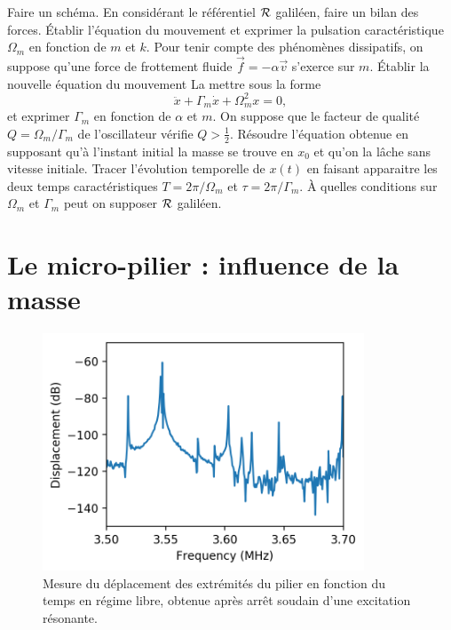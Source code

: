 \documentclass[12pt,a4paper]{exam}
\begin{document}
\begin{questions}
\question Faire un schéma.
\question En considérant le référentiel $\cal{R}$ galiléen, faire un bilan des forces.
\question Établir l'équation du mouvement et exprimer la pulsation caractéristique $\Omega_m$ en fonction de $m$ et $k$.
\question Pour tenir compte des phénomènes dissipatifs, on suppose qu'une force de frottement fluide $\overrightarrow{f}=-\alpha\overrightarrow{v}$ s'exerce sur $m$.
Établir la nouvelle équation du mouvement
\question La mettre sous la forme
\begin{equation}
\ddot{x} + \Gamma_m \dot{x} + \Omega_m^2 x = 0,
\label{eq:damped_oscillator}
\end{equation}
et exprimer $\Gamma_m$ en fonction de $\alpha$ et $m$.
\question On suppose que le facteur de qualité $Q=\Omega_m/\Gamma_m$ de l'oscillateur vérifie $Q>\frac{1}{2}$.
Résoudre l'équation obtenue en supposant qu'à l'instant initial la masse se trouve en $x_0$ et qu'on la lâche sans vitesse initiale.
\question Tracer l'évolution temporelle de $x(t)$ en faisant apparaitre les deux temps caractéristiques $T=2\pi/\Omega_m$ et $\tau=2\pi/\Gamma_m$.
\question À quelles conditions sur $\Omega_m$ et $\Gamma_m$ peut on supposer $\cal{R}$ galiléen.
\end{questions}

\section{Le micro-pilier : influence de la masse}

\begin{figure}
\center
\includegraphics[height=200pt]{broadband_driven_response.png}
\caption{Mesure du déplacement des extrémités du pilier en fonction du temps en régime libre, obtenue après arrêt soudain d'une excitation résonante.}
\label{fig:ringdown}
\end{figure}
\end{document}
